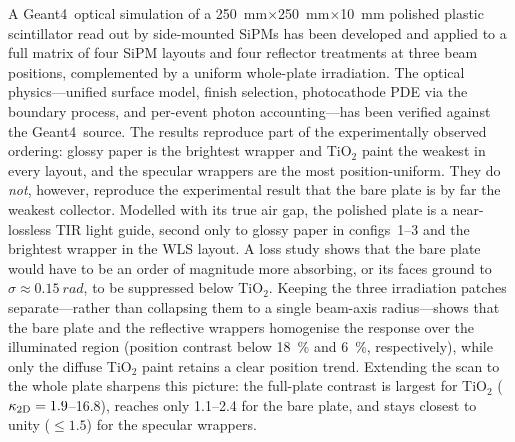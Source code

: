 \documentclass[11pt,a4paper]{article}
\newcommand{\gfour}{Geant4}
\begin{document}
A \gfour\ optical simulation of a \SI{250}{\milli\meter}$\times$\SI{250}{\milli\meter}$\times$\SI{10}{\milli\meter} polished plastic
scintillator read out by side-mounted SiPMs has been developed and applied to a
full matrix of four SiPM layouts and four reflector treatments at three beam
positions, complemented by a uniform whole-plate irradiation. The optical
physics---unified surface model, finish selection, photocathode PDE via the
boundary process, and per-event photon accounting---has been verified against
the \gfour\ source. The results reproduce part of the experimentally observed
ordering: glossy paper is the brightest wrapper and TiO$_2$ paint the weakest in
every layout, and the specular wrappers are the most position-uniform. They do
\emph{not}, however, reproduce the experimental result that the bare plate is by
far the weakest collector. Modelled with its true air gap, the polished plate is
a near-lossless TIR light guide, second only to glossy paper in configs~1--3 and
the brightest wrapper in the WLS layout. A loss study shows that the bare plate
would have to be an order of magnitude more absorbing, or its faces ground to
$\sigma\approx\SI{0.15}{rad}$, to be suppressed below TiO$_2$. Keeping the three
irradiation patches separate---rather than collapsing them to a single beam-axis
radius---shows that the bare plate and the reflective wrappers homogenise the
response over the illuminated region (position contrast below \SI{18}{\percent}
and \SI{6}{\percent}, respectively), while only the diffuse TiO$_2$ paint
retains a clear position trend. Extending the scan to the whole plate sharpens
this picture: the full-plate contrast is largest for TiO$_2$
($\kappa_{\rm 2D} = \num{1.9}$--\num{16.8}), reaches only \num{1.1}--\num{2.4}
for the bare plate, and stays closest to unity ($\le\!\num{1.5}$) for the
specular wrappers.
\end{document}
